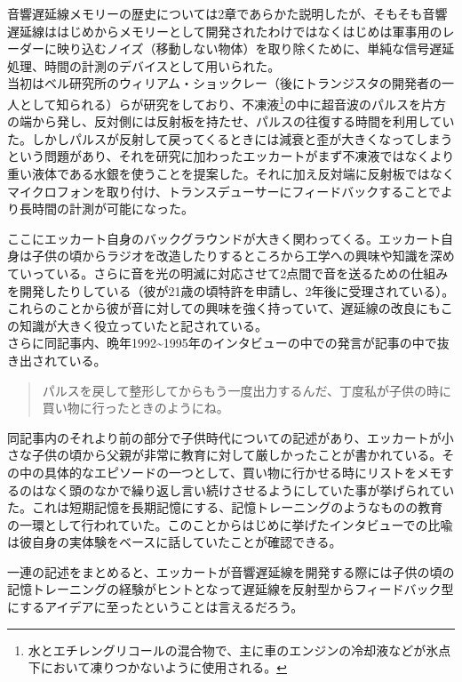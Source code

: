 音響遅延線メモリーの歴史については2章であらかた説明したが、そもそも音響遅延線ははじめからメモリーとして開発されたわけではなくはじめは軍事用のレーダーに映り込むノイズ（移動しない物体）を取り除くために、単純な信号遅延処理、時間の計測のデバイスとして用いられた。\\
当初はベル研究所のウィリアム・ショックレー（後にトランジスタの開発者の一人として知られる）らが研究をしており、不凍液\footnote{水とエチレングリコールの混合物で、主に車のエンジンの冷却液などが氷点下において凍りつかないように使用される。}の中に超音波のパルスを片方の端から発し、反対側には反射板を持たせ、パルスの往復する時間を利用していた。しかしパルスが反射して戻ってくるときには減衰と歪が大きくなってしまうという問題があり、それを研究に加わったエッカートがまず不凍液ではなくより重い液体である水銀を使うことを提案した。それに加え反対端に反射板ではなくマイクロフォンを取り付け、トランスデューサーにフィードバックすることでより長時間の計測が可能になった。

ここにエッカート自身のバックグラウンドが大きく関わってくる。エッカート自身は子供の頃からラジオを改造したりするところから工学への興味や知識を深めていっている。さらに音を光の明滅に対応させて2点間で音を送るための仕組みを開発したりしている（彼が21歳の頃特許を申請し、2年後に受理されている\autocite{presper1942light}）。これらのことから彼が音に対しての興味を強く持っていて、遅延線の改良にもこの知識が大きく役立っていたと記されている。\\
さらに同記事内、晩年1992\textasciitilde{}1995年のインタビューの中での発言が記事の中で抜き出されている。

\begin{quote}
パルスを戻して整形してからもう一度出力するんだ、丁度私が子供の時に買い物に行ったときのようにね。
\end{quote}

同記事内のそれより前の部分で子供時代についての記述があり、エッカートが小さな子供の頃から父親が非常に教育に対して厳しかったことが書かれている。その中の具体的なエピソードの一つとして、買い物に行かせる時にリストをメモするのはなく頭のなかで繰り返し言い続けさせるようにしていた事が挙げられていた。これは短期記憶を長期記憶にする、記憶トレーニングのようなものの教育の一環として行われていた。このことからはじめに挙げたインタビューでの比喩は彼自身の実体験をベースに話していたことが確認できる。

一連の記述をまとめると、エッカートが音響遅延線を開発する際には子供の頃の記憶トレーニングの経験がヒントとなって遅延線を反射型からフィードバック型にするアイデアに至ったということは言えるだろう。

